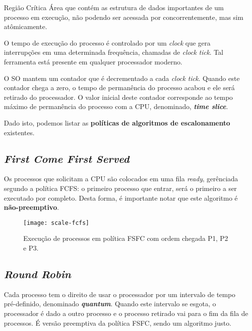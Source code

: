 \begin{definicao}{Região Crítica}
  Área que contém as estrutura de dados importantes de um processo em execução, não podendo ser acessada por concorrentemente, mas sim atômicamente.
\end{definicao}

O tempo de execução do processo é controlado por um \textit{clock} que gera interrupções em uma determinada frequência, chamadas de \textit{clock tick}. Tal ferramenta está presente em qualquer processador moderno.

O SO mantem um contador que é decrementado a cada \textit{clock tick}. Quando este contador chega a zero, o tempo de permanência do processo acabou e ele será retirado do processador. O valor inicial deste contador corresponde ao tempo máximo de permanência do processo com a CPU, denominado, \textbf{\textit{time slice}}.

Dado isto, podemos listar as \textbf{políticas de algoritmos de escalonamento} existentes.



\subsection{\textit{First Come First Served}}
Os processos que solicitam a CPU são colocados em uma fila \textit{ready}, gerênciada segundo a política FCFS: o primeiro processo que entrar, será o primeiro a ser executado por completo. Desta forma, é importante notar que este algoritmo é \textbf{não-preemptivo}.

\begin{figure}
  \centering
  \texttt{[image: scale-fcfs]}
  \caption{Execução de processos em política FSFC com ordem chegada P1, P2 e P3.}
  \label{fig:scale-fcfs}
\end{figure}





\subsection{\textit{Round Robin}}
Cada processo tem o direito de usar o processador por um intervalo de tempo pré-definido, denominado \textbf{\textit{quantum}}. Quando este intervalo se esgota, o processador é dado a outro processo e o processo retirado vai para o fim da fila de processos. É versão preemptiva da política FSFC, sendo um algoritmo justo.

